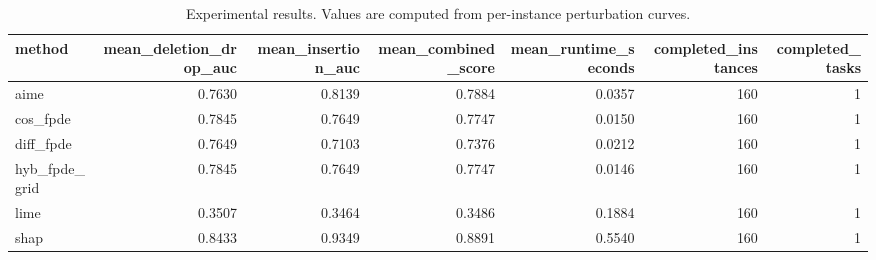\begin{table}[t]
\caption{Experimental results. Values are computed from per-instance perturbation curves.}
\label{tab:main_results_computed}
\centering
\begin{tabular}{lrrrrrr}
\toprule
method & mean\_deletion\_drop\_auc & mean\_insertion\_auc & mean\_combined\_score & mean\_runtime\_seconds & completed\_instances & completed\_tasks \\
\midrule
aime & 0.7630 & 0.8139 & 0.7884 & 0.0357 & 160 & 1 \\
cos\_fpde & 0.7845 & 0.7649 & 0.7747 & 0.0150 & 160 & 1 \\
diff\_fpde & 0.7649 & 0.7103 & 0.7376 & 0.0212 & 160 & 1 \\
hyb\_fpde\_grid & 0.7845 & 0.7649 & 0.7747 & 0.0146 & 160 & 1 \\
lime & 0.3507 & 0.3464 & 0.3486 & 0.1884 & 160 & 1 \\
shap & 0.8433 & 0.9349 & 0.8891 & 0.5540 & 160 & 1 \\
\bottomrule
\end{tabular}

\end{table}
